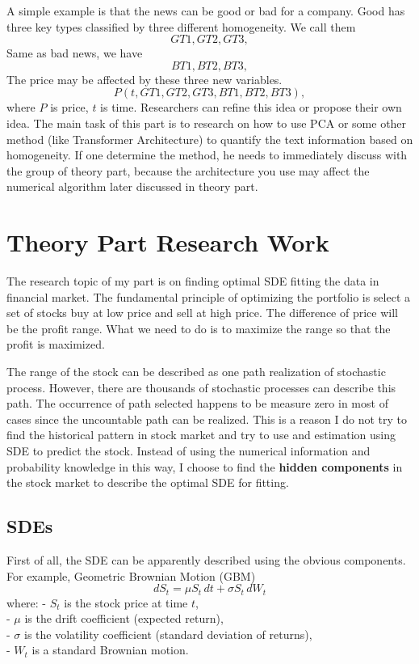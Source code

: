 \documentclass[12pt]{article}
\begin{document}
A simple example is that the news can be good or bad for a company. Good has three key types classified by three different homogeneity. We call them 
\[GT1, GT2, GT3,\] 
Same as bad news, we have 
\[
BT1,BT2,BT3,
\]
The price may be affected by these three new variables. 
\[
P(t,GT1, GT2, GT3,BT1,BT2,BT3),
\]where $P$ is price, $t$ is time. Researchers can refine this idea or propose their own idea. The main task of this part is to research on how to use PCA or some other method (like Transformer Architecture) to quantify the text information based on homogeneity. If one determine the method, he needs to immediately discuss with the group of theory part, because the architecture you use may affect the numerical algorithm later discussed in theory part. 

\section{Theory Part Research Work} 
The research topic of my part is on finding optimal SDE fitting the data in financial market. The fundamental principle of optimizing the portfolio is select a set of stocks buy at low price and sell at high price. The difference of price will be the profit range. What we need to do is to maximize the range so that the profit is maximized. 

The range of the stock can be described as one path realization of stochastic process. However, there are thousands of stochastic processes can describe this path. The occurrence of path selected happens to be measure zero in most of cases since the uncountable path can be realized. This is a reason I do not try to find the historical pattern in stock market and try to use and estimation using SDE to predict the stock. Instead of using the numerical information and probability knowledge in this way, I choose to find the {\bf{hidden components}} in the stock market to describe the optimal SDE for fitting. 

\subsection{SDEs}
First of all, the SDE can be apparently described using the obvious components. For example, Geometric Brownian Motion (GBM)
\[
dS_t = \mu S_t \, dt + \sigma S_t \, dW_t
\]
where:
- \(S_t\) is the stock price at time \(t\),\\
- \(\mu\) is the drift coefficient (expected return),\\
- \(\sigma\) is the volatility coefficient (standard deviation of returns),\\
- \(W_t\) is a standard Brownian motion.
\end{document}
